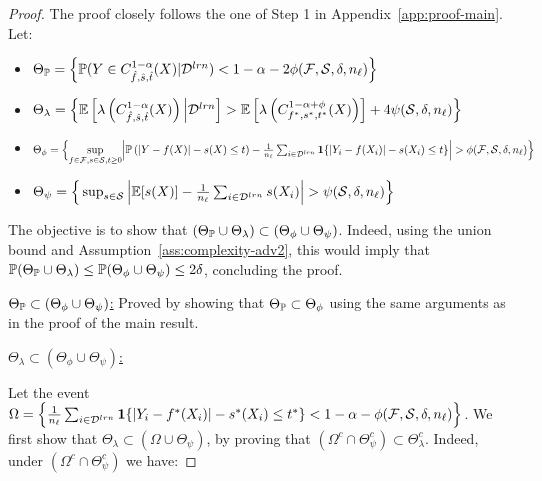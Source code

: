 \begin{proof}
    The proof closely follows the one of Step 1 in Appendix~\ref{app:proof-main}.
    Let:
    \begin{itemize}
        \item $\Theta_{\mathbb{P}}=\Big\{{\mathbb{P}}(Y\in C_{\hat{f},\hat{s},\hat{t}}^{1-\alpha}(X)|{\cal D}^{lrn})< 1-\alpha - 2{\phi(\mathcal{F},{\cal S},\delta,n_\ell)}\Big\}$
        \item $\Theta_\lambda=\Big\{\mathbb{E}\left[\lambda\left(C_{\hat{f},\hat{s},\hat{t}}^{1-\alpha}(X)\right)\Big|{\cal D}^{lrn}\right] > \mathbb{E}\left[\lambda\left(C_{f^*,s^*,t^*}^{1-\alpha + \phi}(X)\right)\right] + 4{\psi({\cal S},\delta,n_\ell)}\Big\}$
        \item $\Theta_\phi=\Big\{\underset{f\in\calF,s\in\calS,t\geq 0}{\sup}\Big|\IP\left(|Y-f(X)|-s(X)\leq t \right) - \frac{1}{n_\ell}\sum_{i\in\calD^{lrn}}\1\{|Y_i-f(X_i)|-s(X_i)\leq t\}\Big|> \phiFSl\Big\}$
        \item $\Theta_\psi = \Big\{\sup_{s\in\calS}\Big|\EE[s(X)] - \frac{1}{n_\ell}\sum_{i\in\calD^{lrn}} s(X_i)\Big|> \psiSl\Big\}$
    \end{itemize}

The objective is to show that $(\Theta_{\mathbb{P}}\cup\Theta_\lambda) \subset (\Theta_\phi \cup \Theta_\psi)$. Indeed, using the union bound and Assumption~\ref{ass:complexity-adv2}, this would imply that ${\mathbb{P}}(\Theta_{\mathbb{P}}\cup\Theta_\lambda)\leq {\mathbb{P}}(\Theta_\phi\cup \Theta_\psi)\leq 2\delta$, concluding the proof.

\underline{$\Theta_{\mathbb{P}}\subset  (\Theta_\phi \cup \Theta_\psi)$:} Proved by showing that $\Theta_{\mathbb{P}}\subset \Theta_\phi$ using the same arguments as in the proof of the main result.

\underline{$\Theta_\lambda\subset (\Theta_\phi \cup \Theta_\psi)$:}

Let the event $\Omega=\Big\{\frac{1}{n_\ell}\sum_{i\in{\cal D}^{lrn}}\mathbf{1}\{|Y_i-f^*(X_i)| - s^*(X_i)\leq t^* \}<1-\alpha - {\phi(\mathcal{F},{\cal S},\delta,n_\ell)}\Big\}$. We first show that $\Theta_\lambda\subset (\Omega \cup \Theta_\psi)$, by proving that $(\Omega^c \cap \Theta^c_\psi)\subset \Theta_\lambda^c$. Indeed, under $(\Omega^c \cap \Theta^c_\psi)$ we have:


\end{proof}
